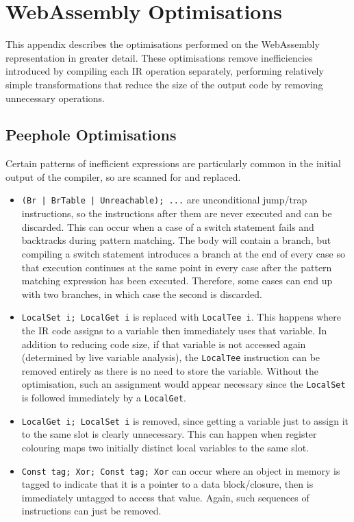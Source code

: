 \chapter{WebAssembly Optimisations}
This appendix describes the optimisations performed on the WebAssembly representation in greater detail. These optimisations remove inefficiencies introduced by compiling each IR operation separately, performing relatively simple transformations that reduce the size of the output code by removing unnecessary operations.


\section{Peephole Optimisations}
Certain patterns of inefficient expressions are particularly common in the initial output of the compiler, so are scanned for and replaced.
\begin{itemize}
\item \texttt{(Br | BrTable | Unreachable); ...} are unconditional jump/trap instructions, so the instructions after them are never executed and can be discarded.
This can occur when a case of a switch statement fails and backtracks during pattern matching. The body will contain a branch, but compiling a switch statement introduces a branch at the end of every case so that execution continues at the same point in every case after the pattern matching expression has been executed. Therefore, some cases can end up with two branches, in which case the second is discarded.

\item \verb|LocalSet i; LocalGet i| is replaced with \verb|LocalTee i|. This happens where the IR code assigns to a variable then immediately uses that variable. In addition to reducing code size, if that variable is not accessed again (determined by live variable analysis), the \verb|LocalTee| instruction can be removed entirely as there is no need to store the variable. Without the optimisation, such an assignment would appear necessary since the \verb|LocalSet| is followed immediately by a \verb|LocalGet|.

\item \verb|LocalGet i; LocalSet i| is removed, since getting a variable just to assign it to the same slot is clearly unnecessary. This can happen when register colouring maps two initially distinct local variables to the same slot.

\item \verb|Const tag; Xor; Const tag; Xor| can occur where an object in memory is tagged to indicate that it is a pointer to a data block/closure, then is immediately untagged to access that value. Again, such sequences of instructions can just be removed.

\end{itemize}



